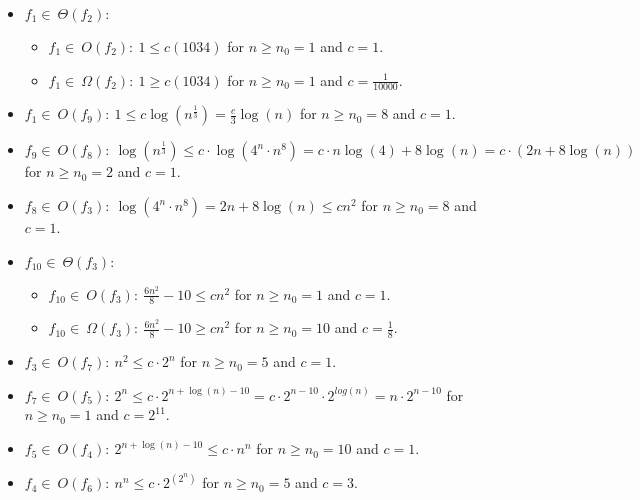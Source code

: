 \documentclass[a4paper]{article}
\theoremstyle{remarksStyle}
\theoremstyle{questionStyle}
\theoremstyle{answerStyle}
\begin{document}
\begin{boxxed}

\begin{itemize}
   \item  $f_{1} \in \ \Theta(f_{2}):$
      \begin{itemize}
          \item   $f_{1} \in \ O(f_{2}): \ 1 \leq c(1034)$ for $n \ge n_0 =1$ and $c=1$.
         \item $f_{1} \in \ \Omega(f_{2}): \ 1 \geq c(1034)$ for $n \ge n_0 =1$ and $c=\frac{1}{10000}$.
     \end{itemize} 

    \item $f_{1} \in \ O(f_{9}): \ 1 \leq c\log(n^\frac{1}{3}) = \frac{c}{3} \log(n) $ for $n \ge n_0 =8$ and $c=1$.

    \item $f_{9} \in \ O(f_{8}): \ \log(n^\frac{1}{3}) \leq c \cdot \log(4^n \cdot n^8) = c \cdot n \log(4) + 8 \log(n) = c \cdot (2n + 8\log(n)) $ for $n \ge n_0 =2$ and $c=1$.

    \item $f_{8} \in \ O(f_{3}): \ \log(4^n \cdot n^8) = 2n + 8\log(n) \leq cn^2 $ for $n \ge n_0 =8$ and $c=1$.
    
    \item  $f_{10} \in \ \Theta(f_{3}):$
      \begin{itemize}
          \item   $f_{10} \in \ O(f_{3}): \ \frac{6n^2}{8} - 10 \leq cn^2 $ for $n \ge n_0 =1$ and $c=1$.
         \item $f_{10} \in \ \Omega(f_{3}): \ \frac{6n^2}{8} - 10 \geq cn^2$ for $n \ge n_0 =10$ and $c=\frac{1}{8}$.
     \end{itemize} 

    \item $f_{3} \in \ O(f_{7}): \ n^2 \leq c \cdot 2^n $ for $n \ge n_0 =5$ and $c=1$.
    
    \item $f_{7} \in \ O(f_{5}): \ 2^n \leq c \cdot 2^{n + \log(n) -10} = c \cdot 2^{n-10} \cdot 2^{log(n)} = n \cdot 2^{n-10} $ for $n \ge n_0 =1$ and $c=2^{11}$.

    \item $f_{5} \in \ O(f_{4}): \ 2^{n + \log(n) -10} \leq c \cdot n^n $ for $n \ge n_0 =10$ and $c=1$.

    \item $f_{4} \in \ O(f_{6}): \ n^n \leq c \cdot 2^{(2^n)} $ for $n \ge n_0 =5$ and $c=3$.
    

\end{itemize} 

\end{boxxed}


\newpage
\end{document}
